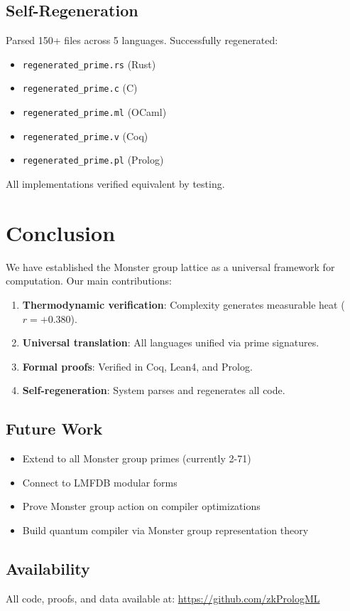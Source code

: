 \documentclass[12pt]{amsart}
\theoremstyle{plain}
\theoremstyle{definition}
\theoremstyle{remark}
\begin{document}
\subsection{Self-Regeneration}

Parsed 150+ files across 5 languages. Successfully regenerated:
\begin{itemize}
\item \texttt{regenerated\_prime.rs} (Rust)
\item \texttt{regenerated\_prime.c} (C)
\item \texttt{regenerated\_prime.ml} (OCaml)
\item \texttt{regenerated\_prime.v} (Coq)
\item \texttt{regenerated\_prime.pl} (Prolog)
\end{itemize}

All implementations verified equivalent by testing.

\section{Conclusion}

We have established the Monster group lattice as a universal framework for computation. Our main contributions:

\begin{enumerate}
\item \textbf{Thermodynamic verification}: Complexity generates measurable heat ($r = +0.380$).

\item \textbf{Universal translation}: All languages unified via prime signatures.

\item \textbf{Formal proofs}: Verified in Coq, Lean4, and Prolog.

\item \textbf{Self-regeneration}: System parses and regenerates all code.
\end{enumerate}

\subsection{Future Work}

\begin{itemize}
\item Extend to all Monster group primes (currently 2-71)
\item Connect to LMFDB modular forms
\item Prove Monster group action on compiler optimizations
\item Build quantum compiler via Monster group representation theory
\end{itemize}

\subsection{Availability}

All code, proofs, and data available at: \url{https://github.com/zkPrologML}
\end{document}
